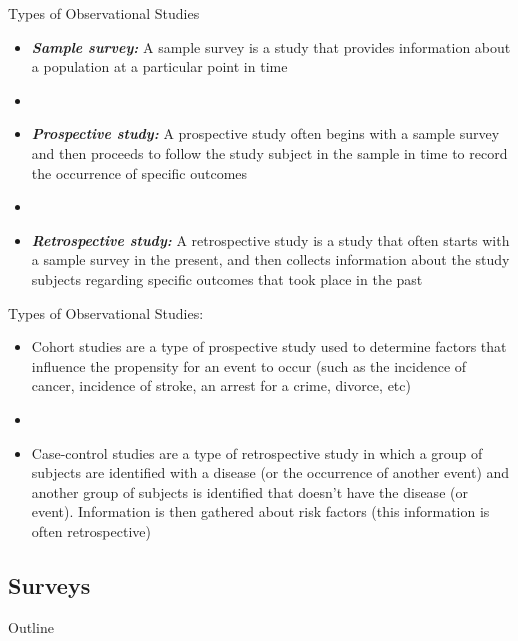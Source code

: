 \documentclass[xcolor=dvipsnames]{beamer}
\begin{document}
\begin{frame}{Types of Observational Studies}
	\begin{itemize}
		\item \textbf{\emph{Sample survey:}} A sample survey is a study that provides information about a population at a particular point in time \pause
		\item[]
		\item \textbf{\emph{Prospective study:}} A prospective study often begins with a sample survey and then proceeds to follow the study subject in the sample in time to record the occurrence of specific outcomes \pause
		\item[]
		\item \textbf{\emph{Retrospective study:}} A retrospective study is a study that often starts with a sample survey in the present, and then collects information about the study subjects regarding specific outcomes that took place in the past
	\end{itemize}
\end{frame}

\begin{frame}{Types of Observational Studies:}
	\begin{itemize}
		\item Cohort studies are a type of prospective study used to determine factors that influence the propensity for an event to occur (such as the incidence of cancer, incidence of stroke, an arrest for a crime, divorce, etc) \pause
		\item[]
		\item Case-control studies are a type of retrospective study in which a group of subjects are identified with a disease (or the occurrence of another event) and another group of subjects is identified that doesn't have the disease (or event). Information is then gathered about risk factors (this information is often retrospective)
	\end{itemize}
\end{frame}

\subsection{Surveys}
\begin{frame}{Outline}
\tableofcontents[currentsection,subsectionstyle=show/shaded/hide]
\end{frame}
\end{document}
